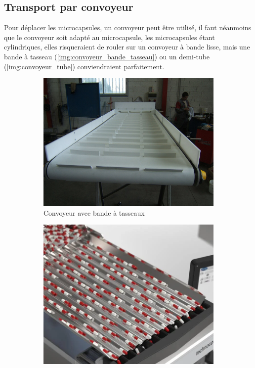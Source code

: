 \subsection*{Transport par convoyeur}
Pour déplacer les \glspl{microcapsule}, un convoyeur peut être utilisé, il faut néanmoins que le convoyeur soit adapté au \gls{microcapsule}, les \glspl{microcapsule} étant cylindriques, elles risqueraient de rouler sur un convoyeur à bande lisse, mais une bande à tasseau (\cf \autoref{img:convoyeur_bande_tasseau}) ou un demi-tube  (\cf \autoref{img:convoyeur_tube}) conviendraient parfaitement.
\begin{figure}[ht]
    \centering
    \begin{subfigure}{0.45\textwidth}
        \centering
        \includegraphics[width=\linewidth]{assets/figures/Hardware/transport_conv/convoyeur_tasseau.JPG}
        \caption{Convoyeur avec bande à tasseaux\footnotemark}
        \label{img:convoyeur_bande_tasseau}
    \end{subfigure}\hfill
    \begin{subfigure}{0.45\textwidth}
        \centering
        \includegraphics[width=\linewidth]{assets/figures/Hardware/transport_conv/convoyeur_tube.png}

\end{subfigure}
\end{figure}

